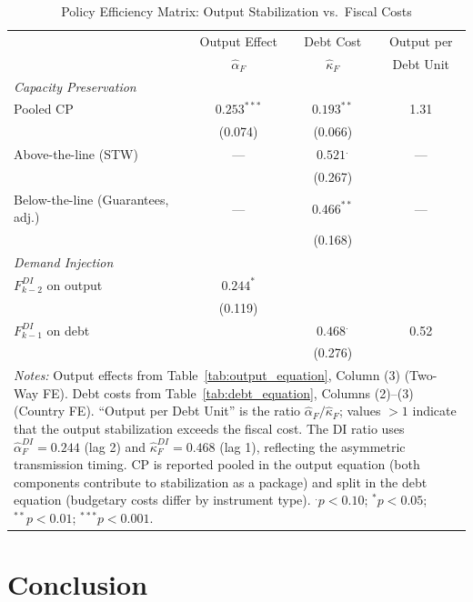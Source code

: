 \documentclass[12pt, a4paper]{article}
\begin{document}
\begin{table}[htbp]
\centering
\caption{Policy Efficiency Matrix: Output Stabilization vs.\ Fiscal Costs}
\label{tab:policy_matrix}
\small
\begin{tabular}{lccc}
\toprule
 & Output Effect & Debt Cost & Output per \\
 & $\hat{\alpha}_F$ & $\hat{\kappa}_F$ & Debt Unit \\
\midrule
\textit{Capacity Preservation} \\[2pt]
\quad Pooled CP
  & $0.253^{***}$ & $0.193^{**}$  & 1.31 \\
  & (0.074)       & (0.066)       &      \\[4pt]
\quad Above-the-line (STW)
  & ---           & $0.521^{.}$   & ---  \\
  &               & (0.267)       &      \\[4pt]
\quad Below-the-line (Guarantees, adj.)
  & ---           & $0.466^{**}$  & ---  \\
  &               & (0.168)       &      \\[6pt]
\textit{Demand Injection} \\[2pt]
\quad $F^{DI}_{k-2}$ on output
  & $0.244^{*}$   &               &      \\
  & (0.119)       &               &      \\[4pt]
\quad $F^{DI}_{k-1}$ on debt
  &               & $0.468^{.}$   & 0.52 \\
  &               & (0.276)       &      \\[6pt]
\midrule
\multicolumn{4}{p{10cm}}{\footnotesize \textit{Notes:} Output effects from Table~\ref{tab:output_equation}, Column (3) (Two-Way FE). Debt costs from Table~\ref{tab:debt_equation}, Columns (2)--(3) (Country FE). ``Output per Debt Unit'' is the ratio $\hat{\alpha}_F / \hat{\kappa}_F$; values $>1$ indicate that the output stabilization exceeds the fiscal cost. The DI ratio uses $\hat{\alpha}^{DI}_F = 0.244$ (lag 2) and $\hat{\kappa}^{DI}_F = 0.468$ (lag 1), reflecting the asymmetric transmission timing. CP is reported pooled in the output equation (both components contribute to stabilization as a package) and split in the debt equation (budgetary costs differ by instrument type). $^{.}p<0.10$; $^{*}p<0.05$; $^{**}p<0.01$; $^{***}p<0.001$.} \\
\end{tabular}
\end{table}


\section{Conclusion}
\end{document}
